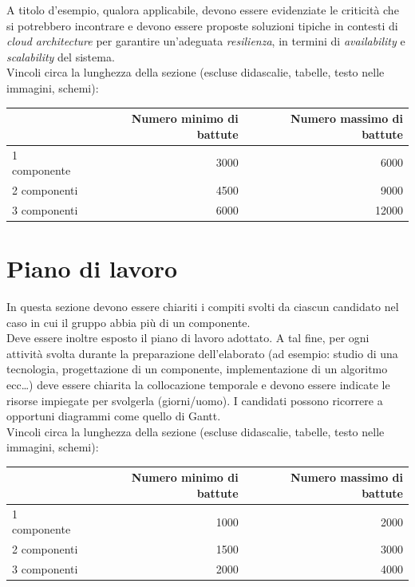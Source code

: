 \documentclass[12pt]{article}
\begin{document}
A titolo d’esempio, qualora applicabile, devono essere evidenziate le criticità che si potrebbero incontrare e devono essere proposte soluzioni tipiche in contesti di \textit{cloud architecture} per garantire un'adeguata \textit{resilienza}, in termini di \textit{availability} e \textit{scalability} del sistema.\\


Vincoli circa la lunghezza della sezione (escluse didascalie, tabelle, testo nelle immagini, schemi):

\vspace{1cm}
\begin{tabular}{l|rr}
 & Numero minimo di battute & Numero massimo di battute \\
 \hline
 1 componente & 3000 & 6000 \\
 2 componenti & 4500 & 9000 \\
 3 componenti & 6000 & 12000 \\
 \hline
\end{tabular}


\newpage



\section{Piano di lavoro}

In questa sezione devono essere chiariti i compiti svolti da ciascun candidato nel caso in cui il gruppo abbia più di un componente.\\

Deve essere inoltre esposto il piano di lavoro adottato. A tal fine, per ogni attività svolta durante la preparazione dell'elaborato (ad esempio: studio di una tecnologia, progettazione di un componente, implementazione di un algoritmo ecc…) deve essere chiarita la collocazione temporale e devono essere indicate le risorse impiegate per svolgerla (giorni/uomo). I candidati possono ricorrere a opportuni diagrammi come quello di Gantt.\\


Vincoli circa la lunghezza della sezione (escluse didascalie, tabelle, testo nelle immagini, schemi):

\vspace{1cm}
\begin{tabular}{l|rr}
 & Numero minimo di battute & Numero massimo di battute \\
 \hline
 1 componente & 1000 & 2000 \\
 2 componenti & 1500 & 3000 \\
 3 componenti & 2000 & 4000 \\
 \hline
\end{tabular}
\end{document}
